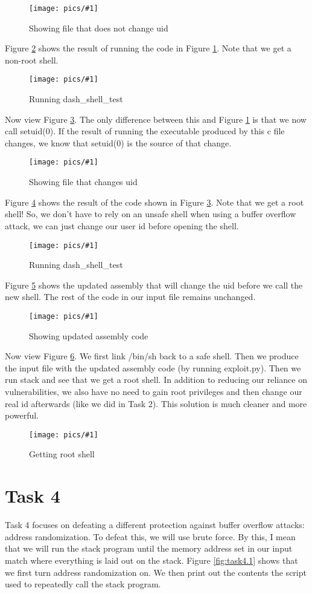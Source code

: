 \documentclass[11pt]{article}
\newcommand{\fig}[2]{ 
\begin{figure}[h]
	\centering
	\caption{#2}
	\texttt{[image: pics/\#1]}
	\label{fig:#1}
\end{figure} 
}
\begin{document}
\fig{task3.1}{Showing file that does not change uid}

Figure \ref{fig:task3.2} shows the result of running the code in Figure \ref{fig:task3.1}. Note that we get a non-root shell.

\fig{task3.2}{Running dash\_shell\_test}

Now view Figure \ref{fig:task3.3}. The only difference between this and Figure \ref{fig:task3.1} is that we now call setuid(0). If the result of running the executable produced by this c file changes, we know that setuid(0) is the source of that change.

\fig{task3.3}{Showing file that changes uid}

Figure \ref{fig:task3.4} shows the result of the code shown in Figure \ref{fig:task3.3}. Note that we get a root shell! So, we don't have to rely on an unsafe shell when using a buffer overflow attack, we can just change our user id before opening the shell.

\fig{task3.4}{Running dash\_shell\_test}

Figure \ref{fig:task3.5} shows the updated assembly that will change the uid before we call the new shell. The rest of the code in our input file remains unchanged.

\fig{task3.5}{Showing updated assembly code}

Now view Figure \ref{fig:task3.6}. We first link /bin/sh back to a safe shell. Then we produce the input file with the updated assembly code (by running exploit.py). Then we run stack and see that we get a root shell. In addition to reducing our reliance on vulnerabilities, we also have no need to gain root privileges and then change our real id afterwards (like we did in Task 2). This solution is much cleaner and more powerful.

\fig{task3.6}{Getting root shell}

\newpage

\section*{Task 4}

Task 4 focuses on defeating a different protection against buffer overflow attacks: address randomization. To defeat this, we will use brute force. By this, I mean that we will run the stack program until the memory address set in our input match where everything is laid out on the stack. Figure \ref{fig:task4.1} shows that we first turn address randomization on. We then print out the contents the script used to repeatedly call the stack program.
\end{document}
